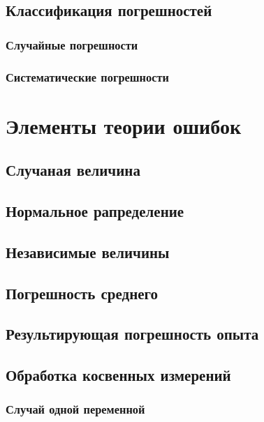 \documentclass[12pt]{article}
\begin{document}
    \subsection{Классификация погрешностей}

      \subsubsection{Случайные погрешности}

      \subsubsection{Систематические погрешности}

  \section{Элементы теории ошибок}

    \subsection{Случаная величина}

    \subsection{Нормальное рапределение}

    \subsection{Независимые величины}

    \subsection{Погрешность среднего}

    \subsection{Результирующая погрешность опыта}

    \subsection{Обработка косвенных измерений}

      \subsubsection{Случай одной переменной}
\end{document}

